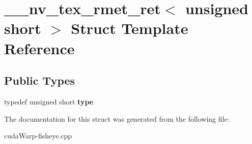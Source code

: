 \hypertarget{struct____nv__tex__rmet__ret_3_01unsigned_01short_01_4}{}\section{\+\_\+\+\_\+nv\+\_\+tex\+\_\+rmet\+\_\+ret$<$ unsigned short $>$ Struct Template Reference}
\label{struct____nv__tex__rmet__ret_3_01unsigned_01short_01_4}
\subsection*{Public Types}
\begin{DoxyCompactItemize}
\item 
typedef unsigned short {\bfseries type}\hypertarget{struct____nv__tex__rmet__ret_3_01unsigned_01short_01_4_a89c26f9e06e3029b714b73716f2714fa}{}\label{struct____nv__tex__rmet__ret_3_01unsigned_01short_01_4_a89c26f9e06e3029b714b73716f2714fa}

\end{DoxyCompactItemize}


The documentation for this struct was generated from the following file\+:\begin{DoxyCompactItemize}
\item 
cuda\+Warp-\/fisheye.\+cpp\end{DoxyCompactItemize}

